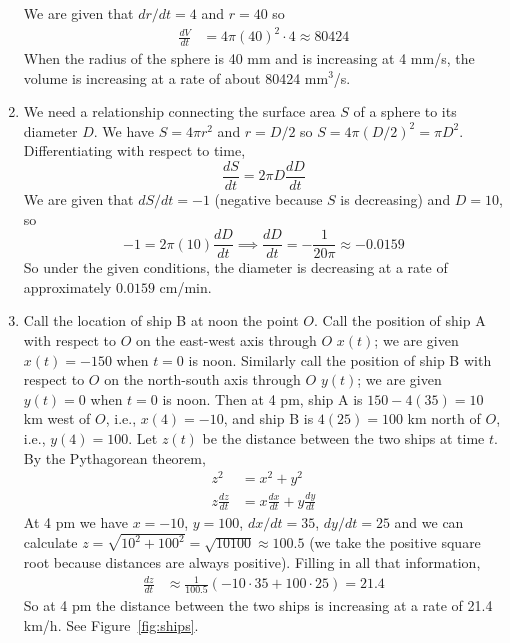 \documentclass{article}
\begin{document}
\begin{enumerate}
  We are given that $dr/dt=4$ and $r=40$ so
  \begin{align*}
    \frac{dV}{dt} &= 4\pi (40)^2 \cdot 4
    \approx 80424
  \end{align*}
  When the radius of the sphere is 40 mm and is increasing at 4 mm/s,
  the volume is increasing at a rate of about 80424 mm$^3$/s.
\item %
  We need a relationship connecting the surface area $S$
  of a sphere to its diameter $D$.  We have $S=4\pi r^2$ and $r=D/2$ so
  $S=4\pi(D/2)^2=\pi D^2$.  Differentiating with respect to time,
  \begin{equation*}
    \frac{dS}{dt} = 2\pi D \frac{dD}{dt}
  \end{equation*}
  We are given that $dS/dt=-1$ (negative because $S$ is decreasing) 
  and $D=10$, so
  \begin{equation*}
    -1 = 2\pi (10) \frac{dD}{dt}
    \implies
    \frac{dD}{dt} = -\frac{1}{20\pi} \approx -0.0159
  \end{equation*}
  So under the given conditions, the diameter is decreasing at a rate of
  approximately $0.0159$ cm/min.
\item \label{prob:ships} %
  Call the location of ship B at noon the point $O$.  Call the
  position of ship A with respect to $O$ on the east-west axis through
  $O$ $x(t)$; we are given $x(t)=-150$ when $t=0$ is noon.  Similarly
  call the position of ship B with respect to $O$ on the north-south
  axis through $O$ $y(t)$; we are given $y(t)=0$ when $t=0$ is noon.
  Then at 4 pm, ship A is $150-4(35)=10$ km west of $O$, i.e.,
  $x(4)=-10$, and ship B is $4(25)=100$ km north of $O$, i.e.,
  $y(4)=100$.  Let $z(t)$ be the distance between the two ships at
  time $t$.  By the Pythagorean theorem,
  \begin{align*}
    z^2 &= x^2 + y^2 \\
    z \frac{dz}{dt} &= x\frac{dx}{dt} + y\frac{dy}{dt}
  \end{align*}
  At 4 pm we have $x=-10$, $y=100$, $dx/dt = 35$, $dy/dt=25$ and we can
  calculate $z=\sqrt{10^2+100^2}=\sqrt{10100}\approx 100.5$ (we take the
  positive square root because distances are always positive).  Filling
  in all that information,
  \begin{align*}
    \frac{dz}{dt} &\approx \frac{1}{100.5} (-10\cdot 35 + 100\cdot 25)
    = 21.4
  \end{align*}
  So at 4 pm the distance between the two ships is increasing at a rate
  of 21.4 km/h.  See Figure~\ref{fig:ships}.

\end{enumerate}
\end{document}
